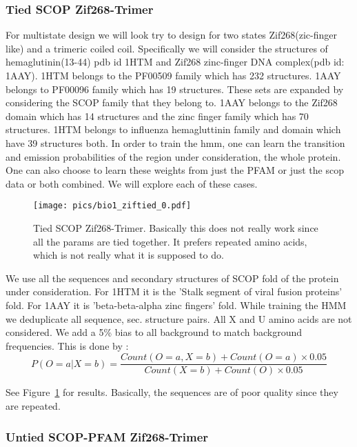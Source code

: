 \documentclass{article}
\begin{document}
\subsubsection{Tied SCOP Zif268-Trimer}
\label{exp:tied_scop_multistate}
For multistate design we will look try to design for two states Zif268(zic-finger like) and a trimeric coiled coil. Specifically we will consider the structures of hemaglutinin(13-44) pdb id 1HTM and Zif268 zinc-finger DNA complex(pdb id: 1AAY). 1HTM belongs to the PF00509 family which has 232 structures. 1AAY belongs to PF00096 family which has 19 structures. These sets are expanded by considering the SCOP family that they belong to. 1AAY belongs to the Zif268 domain which has 14 structures and the zinc finger family which has 70 structures. 1HTM belongs to influenza hemagluttinin family and domain which have 39 structures both. In order to train the hmm, one can learn the transition and emission probabilities of the region under consideration, the whole protein. One can also choose to learn these weights from just the PFAM or just the scop data or both combined. We will explore each of these cases. 


\begin{figure}[h!]
    \centering
    \texttt{[image: pics/bio1\_ziftied\_0.pdf]}
    \caption{Tied SCOP Zif268-Trimer. Basically this does not really work since all the params are tied together. It prefers repeated amino acids, which is not really what it is supposed to do. }
    \label{fig:tied_zif}
\end{figure}

We use all the sequences and secondary structures of SCOP fold of the protein under consideration. For 1HTM it is the 'Stalk segment of viral fusion proteins' fold. For 1AAY it is 'beta-beta-alpha zinc fingers' fold. 
While training the HMM we deduplicate all sequence, sec. structure pairs. All X and U amino acids are not considered. We add a 5\% bias to all background to match background frequencies. This is done by : 
\[
P(O=a|X=b) = \frac{Count(O=a,X=b)+Count(O=a)\times 0.05}{Count(X=b)+Count(O)\times 0.05}
\]

See Figure~\ref{fig:tied_zif} for results. Basically, the sequences are of poor quality since they are repeated. 


\subsubsection{Untied SCOP-PFAM Zif268-Trimer}
\label{exp:untied_scop_zif}
\end{document}
